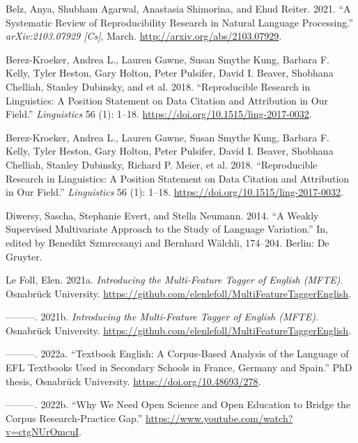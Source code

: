 \documentclass[
  letterpaper,
  DIV=11,
  numbers=noendperiod]{scrreprt}
\newlength{\cslhangindent}
\newenvironment{CSLReferences}[2] %
 {\begin{list}{}{%
  \setlength{\itemindent}{0pt}
  \setlength{\leftmargin}{0pt}
  \setlength{\parsep}{0pt}
  \ifodd #1
   \setlength{\leftmargin}{\cslhangindent}
   \setlength{\itemindent}{-1\cslhangindent}
  \fi
  \setlength{\itemsep}{#2\baselineskip}}}
 {\end{list}}
\begin{document}
\label{refs}
\begin{CSLReferences}{1}{0}
Belz, Anya, Shubham Agarwal, Anastasia Shimorina, and Ehud Reiter. 2021.
{``A Systematic Review of Reproducibility Research in Natural Language
Processing.''} \emph{arXiv:2103.07929 {[}Cs{]}}, March.
\url{http://arxiv.org/abs/2103.07929}.

Berez-Kroeker, Andrea L., Lauren Gawne, Susan Smythe Kung, Barbara F.
Kelly, Tyler Heston, Gary Holton, Peter Pulsifer, David I. Beaver,
Shobhana Chelliah, Stanley Dubinsky, and et al. 2018. {``Reproducible
Research in Linguistics: A Position Statement on Data Citation and
Attribution in Our Field.''} \emph{Linguistics} 56 (1): 1--18.
\url{https://doi.org/10.1515/ling-2017-0032}.

Berez-Kroeker, Andrea L., Lauren Gawne, Susan Smythe Kung, Barbara F.
Kelly, Tyler Heston, Gary Holton, Peter Pulsifer, David I. Beaver,
Shobhana Chelliah, Stanley Dubinsky, Richard P. Meier, et al. 2018.
{``Reproducible Research in Linguistics: A Position Statement on Data
Citation and Attribution in Our Field.''} \emph{Linguistics} 56 (1):
1--18. \url{https://doi.org/10.1515/ling-2017-0032}.

Diwersy, Sascha, Stephanie Evert, and Stella Neumann. 2014. {``A Weakly
Supervised Multivariate Approach to the Study of Language Variation.''}
In, edited by Benedikt Szmrecsanyi and Bernhard Wälchli, 174--204.
Berlin: De Gruyter.

Le Foll, Elen. 2021a. \emph{Introducing the Multi-Feature Tagger of
English (MFTE)}. Osnabrück University.
\url{https://github.com/elenlefoll/MultiFeatureTaggerEnglish}.

---------. 2021b. \emph{Introducing the Multi-Feature Tagger of English
(MFTE)}. Osnabrück University.
\url{https://github.com/elenlefoll/MultiFeatureTaggerEnglish}.

---------. 2022a. {``Textbook English: A Corpus-Based Analysis of the
Language of EFL Textbooks Used in Secondary Schools in France, Germany
and Spain.''} PhD thesis, Osnabrück University.
\url{https://doi.org/10.48693/278}.

---------. 2022b. {``Why We Need Open Science and Open Education to
Bridge the Corpus Research-Practice Gap.''}
\url{https://www.youtube.com/watch?v=ctgNUrOmcuI}.


\end{CSLReferences}
\end{document}
